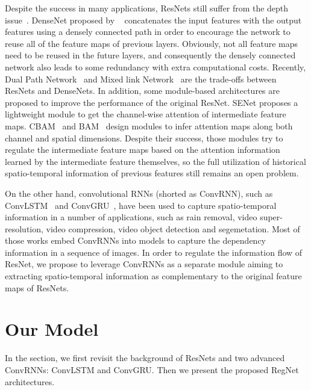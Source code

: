 \documentclass[journal,comsoc]{IEEEtran}
\begin{document}
Despite the success in many applications, ResNets still suffer from the depth issue~\cite{DBLP:journals/corr/HuangSLSW16}. 
DenseNet proposed by ~\cite{DBLP:journals/corr/HuangLW16a} concatenates the input features with the output features using a densely connected path in order to encourage the network to reuse all of the feature maps of previous layers. Obviously, not all feature maps need to be reused in the future layers, and consequently the densely connected network also leads to some redundancy with extra computational costs. Recently, Dual Path Network~\cite{DBLP:journals/corr/ChenLXJYF17} and Mixed link Network~\cite{DBLP:journals/corr/abs-1802-01808} are the trade-offs between ResNets and DenseNets. In addition, some module-based architectures are proposed to improve the performance of the original ResNet. SENet\cite{DBLP:journals/corr/abs-1709-01507} proposes a lightweight module to get the channel-wise attention of intermediate feature maps. CBAM~\cite{DBLP:journals/corr/abs-1807-06521} and BAM~\cite{DBLP:journals/corr/abs-1807-06514} design modules to infer attention maps along both channel
and spatial dimensions. Despite their success, those modules try to regulate the intermediate feature maps based on the attention information learned by the intermediate feature themselves, so the full utilization of historical spatio-temporal information of previous features still remains an open problem. 


On the other hand, convolutional RNNs (shorted as ConvRNN), such as 
ConvLSTM~\cite{DBLP:journals/corr/ShiCWYWW15} and ConvGRU~\cite{DBLP:journals/corr/BallasYPC15}, have been used to capture spatio-temporal information in a number of applications, such as rain removal\cite{DBLP:journals/corr/abs-1807-05698}, video super-resolution\cite{8579237}, video compression\cite{DBLP:journals/corr/abs-1910-12286}, video object detection and segemetation\cite{DBLP:journals/corr/abs-1903-10172,DBLP:journals/corr/SiamVJR16}. Most of those works embed ConvRNNs into models to capture the dependency information in a sequence of images.   In order to regulate the information flow of ResNet, we propose to leverage ConvRNNs as a separate module aiming to extracting spatio-temporal information as complementary to the original feature maps of ResNets.

\section{Our Model}
In the section, we first revisit the background of ResNets and two advanced ConvRNNs: ConvLSTM and ConvGRU. Then we present the proposed RegNet architectures.
\end{document}

